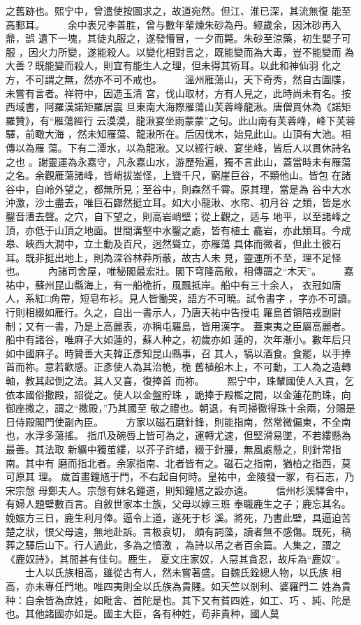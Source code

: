 \documentclass{ctexart}
\begin{document}
之舊跡也。熙宁中，曾遣使按圖求之，故道宛然。但江、淮已深，其流無復 能至高郵耳。 　　余中表兄李善胜，曾与數年輩煉朱砂為丹。經歲余，因沐砂再入鼎，誤 遺下一塊，其徒丸服之，遂發懵冒，一夕而斃。朱砂至涼藥，初生嬰子可服 ，因火力所變，遂能殺人。以變化相對言之，既能變而為大毒，豈不能變而 為大善？既能變而殺人，則宜有能生人之理，但未得其術耳。以此和神仙羽 化之方，不可謂之無，然亦不可不戒也。 　　溫州雁蕩山，天下奇秀，然自古圖牒，未嘗有言者。祥符中，因造玉清 宮，伐山取材，方有人見之，此時尚未有名。按西域書，阿羅漢諾矩羅居震 旦東南大海際雁蕩山芙蓉峰龍湫。唐僧貫休為《諾矩羅贊》，有``雁蕩經行 云漠漠，龍湫宴坐雨蒙蒙''之句。此山南有芙蓉峰，峰下芙蓉驛，前瞰大海 ，然未知雁蕩、龍湫所在。后因伐木，始見此山。山頂有大池。相傳以為雁 蕩。下有二潭水，以為龍湫。又以經行峽、宴坐峰，皆后人以貫休詩名之也 。謝靈運為永嘉守，凡永嘉山水，游歷殆遍，獨不言此山，蓋當時未有雁蕩 之名。余觀雁蕩諸峰，皆峭拔崟怪，上聳千尺，窮崖巨谷，不類他山。皆包 在諸谷中，自岭外望之，都無所見；至谷中，則森然千霄。原其理，當是為 谷中大水沖激，沙土盡去，唯巨石巋然挺立耳。如大小龍湫、水帘、初月谷 之類，皆是水鑿音漕去聲。之穴，自下望之，則高岩峭壁；從上觀之，适与 地平，以至諸峰之頂，亦低于山頂之地面。世間溝壑中水鑿之處，皆有植土 龕岩，亦此類耳。今成皋、峽西大澗中，立土動及百尺，迥然聳立，亦雁蕩 具体而微者，但此土彼石耳。既非挺出地上，則為深谷林莽所蔽，故古人未 見，靈運所不至，理不足怪也。 　　內諸司舍屋，唯秘閣最宏壯。閣下穹隆高敞，相傳謂之``木天''。 　　嘉祐中，蘇州昆山縣海上，有一船桅折，風飄抵岸。船中有三十余人， 衣冠如唐人，系紅□角帶，短皂布衫。見人皆慟哭，語方不可曉。試令書字 ，字亦不可讀。行則相綴如雁行。久之，自出一書示人，乃唐天祐中告授屯 羅島首領陪戎副尉制；又有一書，乃是上高麗表，亦稱屯羅島，皆用漢字。 蓋東夷之臣屬高麗者。船中有諸谷，唯麻子大如蓮的，蘇人种之，初歲亦如 蓮的，次年漸小。數年后只如中國麻子。時贊善大夫韓正彥知昆山縣事，召 其人，犒以酒食。食罷，以手捧首而祢。意若歡感。正彥使人為其治桅，桅 舊植船木上，不可動，工人為之造轉軸，教其起倒之法。其人又喜，復捧首 而祢。 　　熙宁中，珠輦國使人入貢，乞依本國俗撒殿，詔從之。使人以金盤貯珠 ，跪捧于殿檻之間，以金蓮花酌珠，向御座撒之，謂之``撒殿，''乃其國至 敬之禮也。朝退，有司掃徹得珠十余兩，分賜是日侍殿閣門使副內臣。 　　方家以磁石磨針鋒，則能指南，然常微偏東，不全南也，水浮多蕩搖。 指爪及碗唇上皆可為之，運轉尤速，但堅滑易墜，不若縷懸為最善。其法取 新纊中獨茧縷，以芥子許蜡，綴于針腰，無風處懸之，則針常指南。其中有 磨而指北者。余家指南、北者皆有之。磁石之指南，猶柏之指西，莫可原其 理。 歲首畫鐘馗于門，不右起自何時。皇祐中，金陵發一冢，有石志，乃宋宗愨 母鄭夫人。宗愨有妹名鐘道，則知鐘馗之設亦遠。 　　信州杉溪驛舍中，有婦人題壁數百言。自敘世家本士族，父母以嫁三班 奉職鹿生之子；鹿忘其名。娩娠方三日，鹿生利月俸。逼令上道，遂死于杉 溪。將死，乃書此壁，具逼迫苦楚之狀，恨父母遠，無地赴訴。言极哀切， 頗有詞藻，讀者無不感傷。既死，稿葬之驛后山下。行人過此，多為之憤激 ，為詩以吊之者百余篇。人集之，謂之《鹿奴詩》，其間甚有佳句。鹿生， 夏文庄家奴，人惡其貪忍，故斥為``鹿奴''。 　　士人以氏族相高，雖從古有人，然未嘗著盛。自魏氏銓總人物，以氏族 相高，亦未專任門地。唯四夷則全以氏族為貴賤。如天竺以剎利、婆羅門二 姓為貴种：自余皆為庶姓，如毗舍、首陀是也。其下又有貧四姓，如工、巧 、純、陀是也。其他諸國亦如是。國主大臣，各有种姓，苟非貴种，國人莫 
\end{document}
